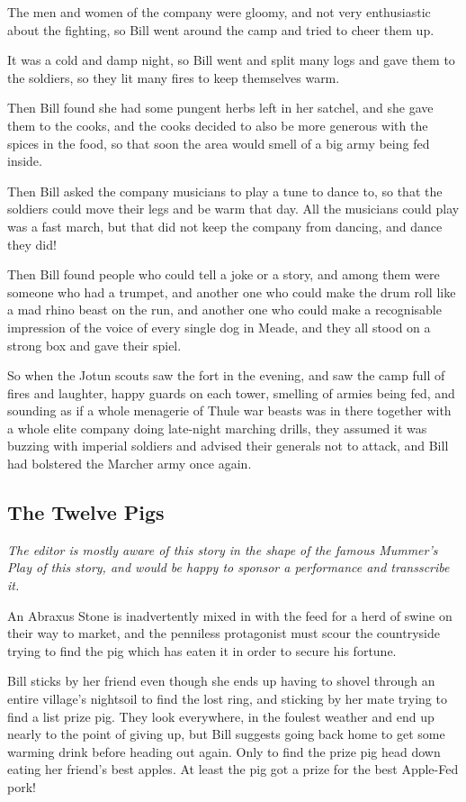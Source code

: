The men and women of the company were gloomy, and not very enthusiastic about the fighting, so Bill went around the camp and tried to cheer them up. 

It was a cold and damp night, so Bill went and split many logs and gave them to the soldiers, so they lit many fires to keep themselves warm.

Then Bill found she had some pungent herbs left in her satchel, and she gave them to the cooks, and the cooks decided to also be more generous with the spices in the food, so that soon the area would smell of a big army being fed inside.

Then Bill asked the company musicians to play a tune to dance to, so that the soldiers could move their legs and be warm that day. All the musicians could play was a fast march, but that did not keep the company from dancing, and dance they did!

Then Bill found people who could tell a joke or a story, and among them were someone who had a trumpet, and another one who could make the drum roll like a mad rhino beast on the run, and another one who could make a recognisable impression of the voice of every single dog in Meade, and they all stood on a strong box and gave their spiel.

So when the Jotun scouts saw the fort in the evening, and saw the camp full of fires and laughter, happy guards on each tower, smelling of armies being fed, and sounding as if a whole menagerie of Thule war beasts was in there together with a whole elite company doing late-night marching drills, they assumed it was buzzing with imperial soldiers and advised their generals not to attack, and Bill had bolstered the Marcher army once again.
\subsection{The Twelve Pigs}
\textit{The editor is mostly aware of this story in the shape of the famous Mummer’s Play of this story, and would be happy to sponsor a performance and transscribe it.}

An Abraxus Stone is inadvertently mixed in with the feed for a herd of swine on their way to market, and the penniless protagonist must scour the countryside trying to find the pig which has eaten it in order to secure his fortune. 

Bill sticks by her friend even though she ends up having to shovel through an entire village's nightsoil to find the lost ring, and sticking by her mate trying to find a list prize pig. They look everywhere, in the foulest weather and end up nearly to the point of giving up, but Bill suggests going back home to get some warming drink before heading out again. Only to find the prize pig head down eating her friend's best apples. At least the pig got a prize for the best Apple-Fed pork!
